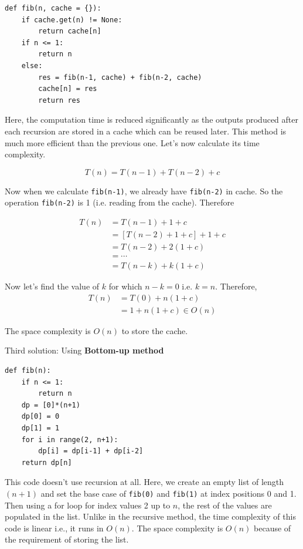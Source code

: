 \documentclass[a4paper,11pt]{book}
\begin{document}
\begin{lstlisting}
def fib(n, cache = {}):
    if cache.get(n) != None:
        return cache[n]
    if n <= 1:
        return n
    else:
        res = fib(n-1, cache) + fib(n-2, cache)
        cache[n] = res
        return res
\end{lstlisting}

\noindent Here, the computation time is reduced significantly as the outputs produced after each recursion are stored in a cache which can be reused later. This method is much more efficient than the previous one. Let's now calculate its time complexity.

$$T(n) = T(n-1) + T(n-2) + c$$

\noindent Now when we calculate \lstinline{fib(n-1)}, we already have \lstinline{fib(n-2)} in cache. So the operation \lstinline{fib(n-2)} is 1 (i.e. reading from the cache). Therefore

\begin{align*}
    T(n) &= T(n-1) + 1 + c\\
         &=\left[T(n-2) + 1 + c\right] + 1 + c\\
         &=T(n-2) + 2(1+c)\\
         &= \cdots\\
         &= T(n-k) + k(1+c)
\end{align*}

\noindent Now let's find the value of $k$ for which $n-k = 0$ i.e. $k=n$. Therefore,
\begin{align*}
	T(n) &= T(0) + n(1+c)\\
	     &= 1 + n(1+c) \in O(n)
\end{align*}

\noindent The space complexity is $O(n)$ to store the cache.
\vspace{3mm}

\noindent Third solution: Using \textbf{Bottom-up method}

\begin{lstlisting}
def fib(n):
    if n <= 1:
        return n
    dp = [0]*(n+1)
    dp[0] = 0
    dp[1] = 1 
    for i in range(2, n+1):
        dp[i] = dp[i-1] + dp[i-2]
    return dp[n]
\end{lstlisting}

\noindent This code doesn't use recursion at all. Here, we create an empty list of length $(n+1)$ and set the base case of \lstinline{fib(0)} and \lstinline{fib(1)} at index positions 0 and 1. Then using a for loop for index values 2 up to $n$, the rest of the values are populated in the list. Unlike in the recursive method, the time complexity of this code is linear i.e., it runs in $O(n)$. The space complexity is $O(n)$ because of the requirement of storing the list.
\end{document}
